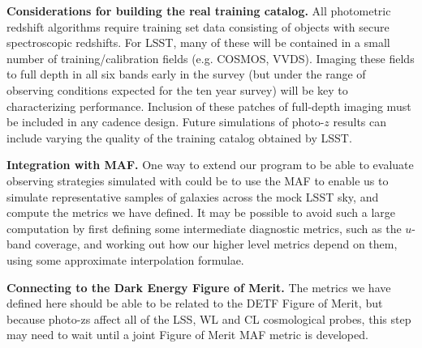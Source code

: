 \textbf{Considerations for building the real training catalog.} All
photometric redshift algorithms require training set data consisting of
objects with secure spectroscopic redshifts.  For LSST, many of these
will be contained in a small number of training/calibration fields (e.g.
COSMOS, VVDS).  Imaging these fields to full depth in all six bands
early in the survey (but under the range of observing conditions
expected for the ten year survey) will be key to characterizing
performance.  Inclusion of these patches of full-depth imaging must be
included in any cadence design. Future simulations of photo-$z$ results
can include varying the quality of the training catalog obtained by
LSST.

\textbf{Integration with MAF.} One way to extend our program to be able
to evaluate observing strategies simulated with \OpSim could be to use
the MAF to enable us to simulate representative samples of galaxies
across the mock LSST sky, and compute the metrics we have defined.
It may be possible to avoid such a large computation by first defining
some intermediate diagnostic metrics, such as the $u$-band coverage, and
working out how our higher level metrics depend on them, using some
approximate interpolation formulae.

\textbf{Connecting to the Dark Energy Figure of Merit.} The metrics we
have defined here should be able to be related to the DETF Figure of
Merit, but because photo-zs affect all of the LSS, WL and CL
cosmological probes, this step may need to wait until a joint
Figure of Merit MAF metric is developed.

\navigationbar

